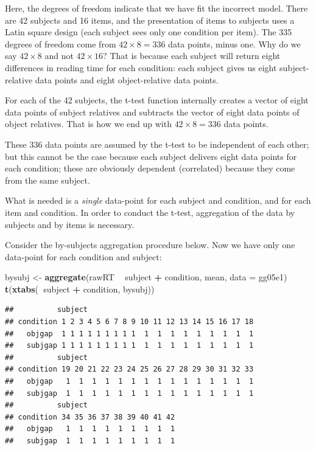 \documentclass[12pt,]{krantz}
\newenvironment{Shaded}{\begin{snugshade}}{\end{snugshade}}
\newcommand{\DataTypeTok}[1]{\textcolor[rgb]{0.13,0.29,0.53}{#1}}
\newcommand{\KeywordTok}[1]{\textcolor[rgb]{0.13,0.29,0.53}{\textbf{#1}}}
\newcommand{\NormalTok}[1]{#1}
\newcommand{\OperatorTok}[1]{\textcolor[rgb]{0.81,0.36,0.00}{\textbf{#1}}}
\newcommand{\StringTok}[1]{\textcolor[rgb]{0.31,0.60,0.02}{#1}}
\begin{document}
Here, the degrees of freedom indicate that we have fit the incorrect model. There are 42 subjects and 16 items, and the presentation of items to subjects uses a Latin square design (each subject sees only one condition per item). The 335 degrees of freedom come from \(42\times 8=336\) data points, minus one. Why do we say \(42\times 8\) and not \(42\times 16\)? That is because each subject will return eight differences in reading time for each condition: each subject gives us eight subject-relative data points and eight object-relative data points.

For each of the 42 subjects, the t-test function internally creates a vector of eight data points of subject relatives and subtracts the vector of eight data points of object relatives. That is how we end up with \(42\times 8=336\) data points.

These 336 data points are assumed by the t-test to be independent of each other; but this cannot be the case because each subject delivers eight data points for each condition; these are obviously dependent (correlated) because they come from the same subject.

What is needed is a \emph{single} data-point for each subject and condition, and for each item and condition. In order to conduct the t-test, aggregation of the data by subjects and by items is necessary.

Consider the by-subjects aggregation procedure below. Now we have only one data-point for each condition and subject:

\begin{Shaded}
\begin{Highlighting}[]
\NormalTok{bysubj <-}\StringTok{ }\KeywordTok{aggregate}\NormalTok{(rawRT }\OperatorTok{~}\StringTok{ }\NormalTok{subject }\OperatorTok{+}\StringTok{ }\NormalTok{condition, mean, }
  \DataTypeTok{data =}\NormalTok{ gg05e1)}
\KeywordTok{t}\NormalTok{(}\KeywordTok{xtabs}\NormalTok{(}\OperatorTok{~}\NormalTok{subject }\OperatorTok{+}\StringTok{ }\NormalTok{condition, bysubj))}
\end{Highlighting}
\end{Shaded}

\begin{verbatim}
##          subject
## condition 1 2 3 4 5 6 7 8 9 10 11 12 13 14 15 16 17 18
##   objgap  1 1 1 1 1 1 1 1 1  1  1  1  1  1  1  1  1  1
##   subjgap 1 1 1 1 1 1 1 1 1  1  1  1  1  1  1  1  1  1
##          subject
## condition 19 20 21 22 23 24 25 26 27 28 29 30 31 32 33
##   objgap   1  1  1  1  1  1  1  1  1  1  1  1  1  1  1
##   subjgap  1  1  1  1  1  1  1  1  1  1  1  1  1  1  1
##          subject
## condition 34 35 36 37 38 39 40 41 42
##   objgap   1  1  1  1  1  1  1  1  1
##   subjgap  1  1  1  1  1  1  1  1  1
\end{verbatim}
\end{document}
